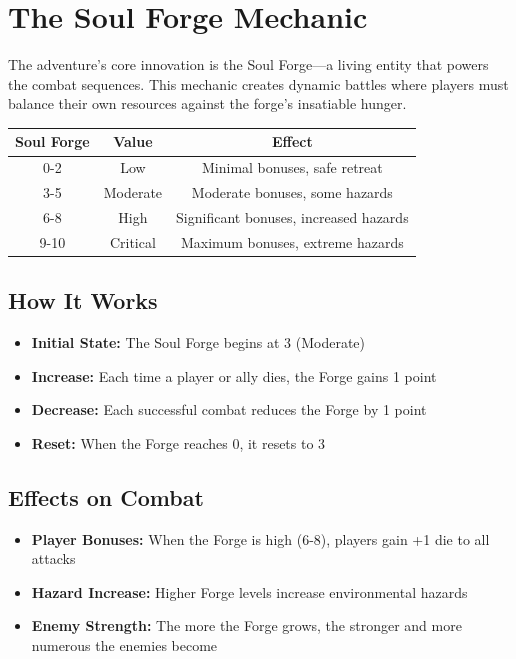 \documentclass[11pt]{article}
\begin{document}
\section{The Soul Forge Mechanic}

The adventure's core innovation is the Soul Forge---a living entity that powers the combat sequences. This mechanic creates dynamic battles where players must balance their own resources against the forge's insatiable hunger.

\begin{center}
\begin{longtable}{|c|c|c|}
\hline
\textbf{Soul Forge} & \textbf{Value} & \textbf{Effect} \\
\hline
0-2 & Low & Minimal bonuses, safe retreat \\
\hline
3-5 & Moderate & Moderate bonuses, some hazards \\
\hline
6-8 & High & Significant bonuses, increased hazards \\
\hline
9-10 & Critical & Maximum bonuses, extreme hazards \\
\hline
\end{longtable}
\end{center}

\subsection{How It Works}

\begin{itemize}
    \item \textbf{Initial State:} The Soul Forge begins at 3 (Moderate)
    \item \textbf{Increase:} Each time a player or ally dies, the Forge gains 1 point
    \item \textbf{Decrease:} Each successful combat reduces the Forge by 1 point
    \item \textbf{Reset:} When the Forge reaches 0, it resets to 3
\end{itemize}

\subsection{Effects on Combat}

\begin{itemize}
    \item \textbf{Player Bonuses:} When the Forge is high (6-8), players gain +1 die to all attacks
    \item \textbf{Hazard Increase:} Higher Forge levels increase environmental hazards
    \item \textbf{Enemy Strength:} The more the Forge grows, the stronger and more numerous the enemies become
\end{itemize}
\end{document}
